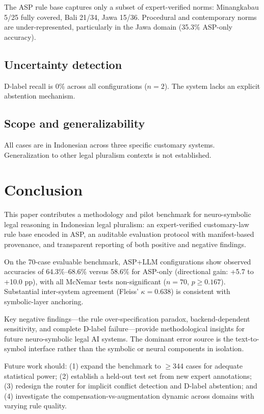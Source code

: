 \documentclass[pdflatex,sn-basic,Numbered]{sn-jnl}
\begin{document}
The ASP rule base captures only a subset of expert-verified norms: Minangkabau 5/25 fully covered, Bali 21/34, Jawa 15/36.
Procedural and contemporary norms are under-represented, particularly in the Jawa domain (35.3\% ASP-only accuracy).

\subsection{Uncertainty detection}\label{subsec:lim-dlabel}

D-label recall is 0\% across all configurations ($n=2$).
The system lacks an explicit abstention mechanism.

\subsection{Scope and generalizability}\label{subsec:lim-scope}

All cases are in Indonesian across three specific customary systems.
Generalization to other legal pluralism contexts is not established.

\section{Conclusion}\label{sec:conclusion}

This paper contributes a methodology and pilot benchmark for neuro-symbolic legal reasoning in Indonesian legal pluralism: an expert-verified customary-law rule base encoded in ASP, an auditable evaluation protocol with manifest-based provenance, and transparent reporting of both positive and negative findings.

On the 70-case evaluable benchmark, ASP+LLM configurations show observed accuracies of 64.3\%--68.6\% versus 58.6\% for ASP-only (directional gain: +5.7 to +10.0 pp), with all McNemar tests non-significant ($n=70$, $p \geq 0.167$).
Substantial inter-system agreement (Fleiss' $\kappa = 0.638$) is consistent with symbolic-layer anchoring.

Key negative findings---the rule over-specification paradox, backend-dependent sensitivity, and complete D-label failure---provide methodological insights for future neuro-symbolic legal AI systems.
The dominant error source is the text-to-symbol interface rather than the symbolic or neural components in isolation.

Future work should: (1) expand the benchmark to $\geq$344 cases for adequate statistical power; (2) establish a held-out test set from new expert annotations; (3) redesign the router for implicit conflict detection and D-label abstention; and (4) investigate the compensation-vs-augmentation dynamic across domains with varying rule quality.
\end{document}
